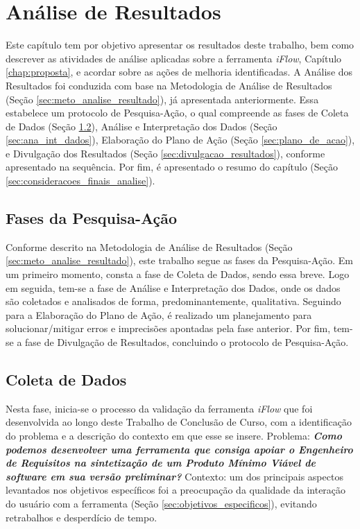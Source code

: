\chapter[Análise de Resultados]{Análise de Resultados}

\label{chap:analise_resultados}
Este capítulo tem por objetivo apresentar os resultados deste trabalho, bem como descrever as atividades de análise aplicadas sobre a ferramenta \textit{iFlow}, Capítulo \ref{chap:proposta}, e acordar sobre as ações de melhoria identificadas. A Análise dos Resultados foi conduzida com base na Metodologia de Análise de Resultados (Seção \ref{sec:meto_analise_resultado}), já apresentada anteriormente. Essa estabelece um protocolo de Pesquisa-Ação, o qual compreende as fases de Coleta de Dados (Seção \ref{sec:coleta_de_dados}), Análise e Interpretação dos Dados (Seção \ref{sec:ana_int_dados}), Elaboração do Plano de Ação (Seção \ref{sec:plano_de_acao}), e Divulgação dos Resultados (Seção \ref{sec:divulgacao_resultados}), conforme apresentado na sequência. Por fim, é apresentado o resumo do capítulo (Seção \ref{sec:consideracoes_finais_analise}).

\section{Fases da Pesquisa-Ação}
Conforme descrito na Metodologia de Análise de Resultados (Seção \ref{sec:meto_analise_resultado}), este trabalho segue as fases da Pesquisa-Ação. Em um primeiro momento, consta a fase de Coleta de Dados, sendo essa breve. Logo em seguida, tem-se a fase de Análise e Interpretação dos Dados, onde os dados são coletados e analisados de forma, predominantemente, qualitativa. Seguindo para a Elaboração do Plano de Ação, é realizado um planejamento para solucionar/mitigar erros e imprecisões apontadas pela fase anterior. Por fim, tem-se a fase de Divulgação de Resultados, concluindo o protocolo de Pesquisa-Ação.

\section{Coleta de Dados}
\label{sec:coleta_de_dados}
Nesta fase, inicia-se o processo da validação da ferramenta \textit{iFlow} que foi desenvolvida ao longo deste Trabalho de Conclusão de Curso, com a identificação do problema e a descrição do contexto em que esse se insere. Problema: \textit{\textbf{Como podemos desenvolver uma ferramenta que consiga apoiar o Engenheiro de Requisitos na sintetização de um Produto Mínimo Viável de \textit{software} em sua versão preliminar?}} Contexto: um dos principais aspectos levantados nos objetivos específicos foi a preocupação da qualidade da interação do usuário com a ferramenta (Seção \ref{sec:objetivos_especificos}), evitando retrabalhos e desperdício de tempo.

